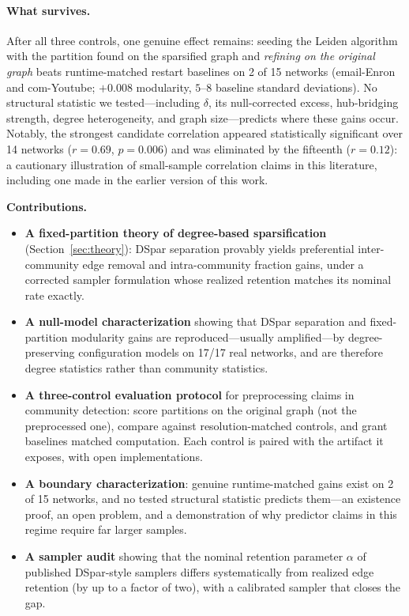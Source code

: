 \paragraph{What survives.}
After all three controls, one genuine effect remains: seeding the Leiden algorithm~\cite{traag2019louvain} with the partition found on the sparsified graph and \emph{refining on the original graph} beats runtime-matched restart baselines on 2 of 15 networks (email-Enron and com-Youtube; $+0.008$ modularity, $5$--$8$ baseline standard deviations).
No structural statistic we tested---including $\delta$, its null-corrected excess, hub-bridging strength, degree heterogeneity, and graph size---predicts where these gains occur.
Notably, the strongest candidate correlation appeared statistically significant over 14 networks ($r = 0.69$, $p = 0.006$) and was eliminated by the fifteenth ($r = 0.12$): a cautionary illustration of small-sample correlation claims in this literature, including one made in the earlier version of this work.

\noindent\textbf{Contributions.}
\begin{itemize}
    \item \textbf{A fixed-partition theory of degree-based sparsification} (Section~\ref{sec:theory}): DSpar separation provably yields preferential inter-community edge removal and intra-community fraction gains, under a corrected sampler formulation whose realized retention matches its nominal rate exactly.

    \item \textbf{A null-model characterization} showing that DSpar separation and fixed-partition modularity gains are reproduced---usually amplified---by degree-preserving configuration models on 17/17 real networks, and are therefore degree statistics rather than community statistics.

    \item \textbf{A three-control evaluation protocol} for preprocessing claims in community detection: score partitions on the original graph (not the preprocessed one), compare against resolution-matched controls, and grant baselines matched computation. Each control is paired with the artifact it exposes, with open implementations.

    \item \textbf{A boundary characterization}: genuine runtime-matched gains exist on 2 of 15 networks, and no tested structural statistic predicts them---an existence proof, an open problem, and a demonstration of why predictor claims in this regime require far larger samples.

    \item \textbf{A sampler audit} showing that the nominal retention parameter $\alpha$ of published DSpar-style samplers differs systematically from realized edge retention (by up to a factor of two), with a calibrated sampler that closes the gap.
\end{itemize}

